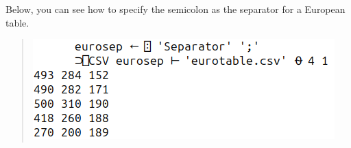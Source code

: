 \documentclass[a4paper,12pt]{book}
\begin{document}
Below, you can see how to specify
the semicolon as the separator
for a European table.
\begin{quote}
\includegraphics{srcfigs/CSV-eurosep.png}
\end{quote}
\end{document}
